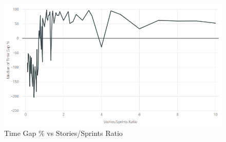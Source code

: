 \begin{figure}[h!]
    \centering
    \includegraphics[width=\textwidth]{Figures/Results/annealing_time_gap_stories_sprints.png}
    \caption{Time Gap \% vs Stories/Sprints Ratio}
    \label{fig:time_gap_vs_stories_sprints}
\end{figure}